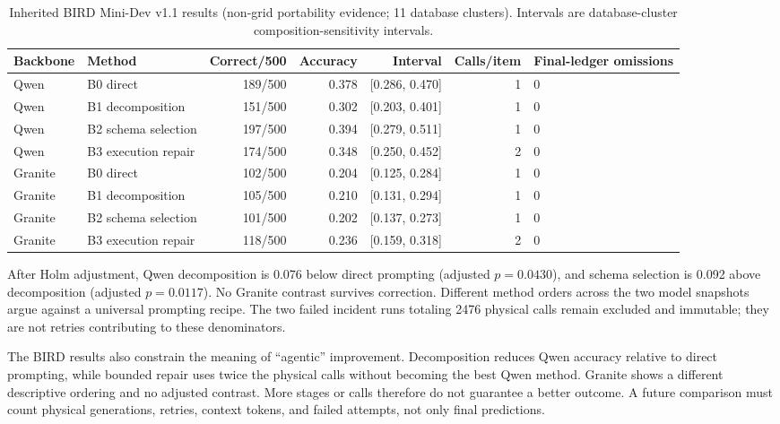\documentclass[applsci,article,submit,moreauthors]{Definitions/mdpi}
\begin{document}
\begin{table}[htbp]
\caption{Inherited BIRD Mini-Dev v1.1 results (non-grid portability evidence; 11 database clusters). Intervals are database-cluster composition-sensitivity intervals.}
\label{tab:bird}
\centering
\small
\setlength{\tabcolsep}{3pt}
\begin{tabular}{llrrrrp{1.5cm}}
\toprule
Backbone & Method & Correct/500 & Accuracy & Interval & Calls/item & Final-ledger omissions\\
\midrule
Qwen & B0 direct & 189/500 & 0.378 & [0.286, 0.470] & 1 & 0\\
Qwen & B1 decomposition & 151/500 & 0.302 & [0.203, 0.401] & 1 & 0\\
Qwen & B2 schema selection & 197/500 & 0.394 & [0.279, 0.511] & 1 & 0\\
\cmidrule(lr){1-7}
Qwen & B3 execution repair & 174/500 & 0.348 & [0.250, 0.452] & 2 & 0\\
Granite & B0 direct & 102/500 & 0.204 & [0.125, 0.284] & 1 & 0\\
Granite & B1 decomposition & 105/500 & 0.210 & [0.131, 0.294] & 1 & 0\\
Granite & B2 schema selection & 101/500 & 0.202 & [0.137, 0.273] & 1 & 0\\
\cmidrule(lr){1-7}
Granite & B3 execution repair & 118/500 & 0.236 & [0.159, 0.318] & 2 & 0\\
\bottomrule
\end{tabular}
\end{table}

After Holm adjustment, Qwen decomposition is 0.076 below direct prompting (adjusted $p=0.0430$), and schema selection is 0.092 above decomposition (adjusted $p=0.0117$). No Granite contrast survives correction. Different method orders across the two model snapshots argue against a universal prompting recipe. The two failed incident runs totaling 2476 physical calls remain excluded and immutable; they are not retries contributing to these denominators.

The BIRD results also constrain the meaning of ``agentic'' improvement. Decomposition reduces Qwen accuracy relative to direct prompting, while bounded repair uses twice the physical calls without becoming the best Qwen method. Granite shows a different descriptive ordering and no adjusted contrast. More stages or calls therefore do not guarantee a better outcome. A future comparison must count physical generations, retries, context tokens, and failed attempts, not only final predictions.
\end{document}
